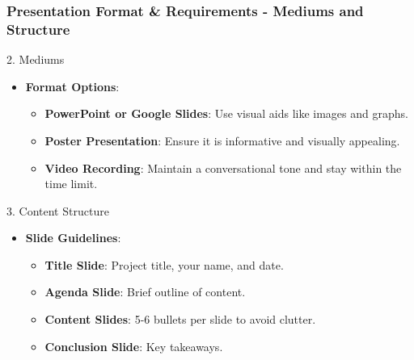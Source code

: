 \documentclass[aspectratio=169]{beamer}
\begin{document}
\begin{frame}[fragile]
    \frametitle{Presentation Format \& Requirements - Mediums and Structure}
    \begin{block}{2. Mediums}
        \begin{itemize}
            \item \textbf{Format Options}:
                \begin{itemize}
                    \item \textbf{PowerPoint or Google Slides}: Use visual aids like images and graphs.
                    \item \textbf{Poster Presentation}: Ensure it is informative and visually appealing.
                    \item \textbf{Video Recording}: Maintain a conversational tone and stay within the time limit.
                \end{itemize}
        \end{itemize}
    \end{block}
    
    \begin{block}{3. Content Structure}
        \begin{itemize}
            \item \textbf{Slide Guidelines}:
                \begin{itemize}
                    \item \textbf{Title Slide}: Project title, your name, and date.
                    \item \textbf{Agenda Slide}: Brief outline of content.
                    \item \textbf{Content Slides}: 5-6 bullets per slide to avoid clutter.
                    \item \textbf{Conclusion Slide}: Key takeaways.
                \end{itemize}
        \end{itemize}
    \end{block}
\end{frame}
\end{document}
